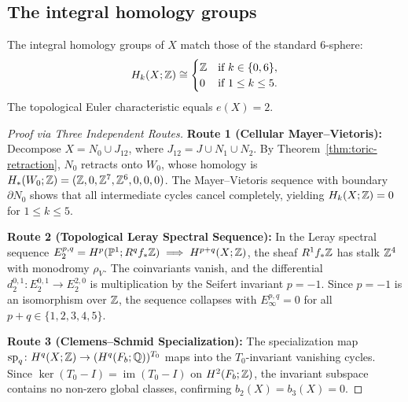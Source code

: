 \subsection{The integral homology groups}

\begin{theorem}\label{thm:homology-consensus}
The integral homology groups of $X$ match those of the standard $6$-sphere:
\[
H_k(X; \mathbb{Z}) \cong \begin{cases} \mathbb{Z} & \text{if } k \in \{0, 6\}, \\ 0 & \text{if } 1 \le k \le 5. \end{cases}
\]
The topological Euler characteristic equals $e(X) = 2$.
\end{theorem}

\begin{proof}[Proof via Three Independent Routes]
\textbf{Route 1 (Cellular Mayer--Vietoris):}
Decompose $X = N_0 \cup J_{12}$, where $J_{12} = J \cup N_1 \cup N_2$.
By Theorem~\ref{thm:toric-retraction}, $N_0$ retracts onto $W_0$, whose homology is $H_*(W_0;\mathbb{Z}) = (\mathbb{Z}, 0, \mathbb{Z}^7, \mathbb{Z}^6, 0, 0, 0)$.
The Mayer--Vietoris sequence with boundary $\partial N_0$ shows that all intermediate cycles cancel completely, yielding $H_k(X;\mathbb{Z}) = 0$ for $1 \le k \le 5$.

\textbf{Route 2 (Topological Leray Spectral Sequence):}
In the Leray spectral sequence $E_2^{p,q} = H^p(\mathbb{P}^1; R^q f_* \mathbb{Z}) \implies H^{p+q}(X;\mathbb{Z})$, the sheaf $R^1 f_* \mathbb{Z}$ has stalk $\mathbb{Z}^4$ with monodromy $\rho_V$.
The coinvariants vanish, and the differential $d_2^{0,1} \colon E_2^{0,1} \to E_2^{2,0}$ is multiplication by the Seifert invariant $p = -1$.
Since $p = -1$ is an isomorphism over $\mathbb{Z}$, the sequence collapses with $E_\infty^{p,q} = 0$ for all $p+q \in \{1, 2, 3, 4, 5\}$.

\textbf{Route 3 (Clemens--Schmid Specialization):}
The specialization map $\mathrm{sp}_q \colon H^q(X;\mathbb{Z}) \to (H^q(F_b;\mathbb{Q}))^{T_0}$ maps into the $T_0$-invariant vanishing cycles.
Since $\ker(T_0 - I) = \operatorname{im}(T_0 - I)$ on $H^2(F_b;\mathbb{Z})$, the invariant subspace contains no non-zero global classes, confirming $b_2(X) = b_3(X) = 0$.
\end{proof}
